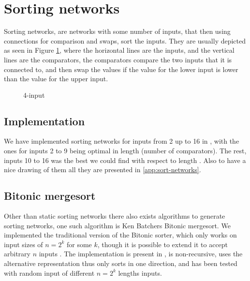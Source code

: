 \section{Sorting networks}
Sorting networks, are networks with some number of inputs, that then using
connections for comparison and swaps, sort the inputs. They are usually
depicted as seen in Figure \ref{fig:sort-network1}, where the horizontal lines
are the inputs, and the vertical lines are the comparators, the comparators
compare the two inputs that it is connected to, and then swap the values if the
value for the lower input is lower than the value for the upper input.
\begin{figure}[htb]
    \centering
    \begin{sortingnetwork}{4}{0.4}
        \addtocounter{sncolumncounter}{2}
        \addtocounter{sncolumncounter}{2}
    \end{sortingnetwork}
    \caption{4-input}
    \label{fig:sort-network1}
\end{figure}

\subsection{Implementation}
We have implemented sorting networks for inputs from 2 up to 16 in
, with the ones for inputs 2 to 9 being optimal
\cite{CCFS-2014}\cite{ron-zeno} in length (number of comparators). The rest,
inputs 10 to 16 was the best we could find with respect to length
\cite{hugues-juille}\cite{ron-zeno}. Also to have a nice drawing of them all
they are presented in \ref{app:sort-networks}.

\subsection{Bitonic mergesort}
Other than static sorting networks there also exists algorithms to generate
sorting networks, one such algorithm is Ken Batchers Bitonic mergesort. We
implemented the traditional version of the Bitonic sorter, which only works on
input sizes of $n = 2^k$ for some $k$, though it is possible to extend it to
accept arbitrary $n$ inputs \cite{hw-lang}. The implementation is present in
, is non-recursive, uses the alternative representation thus
only sorts in one direction, and has been tested with random input of different
$n = 2^k$ lengths inputs.

